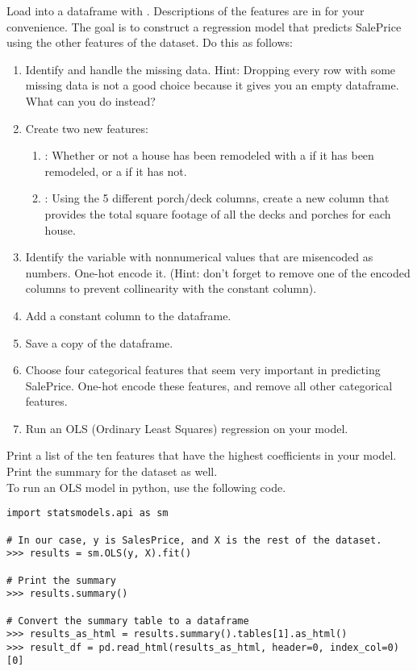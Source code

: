 \begin{problem}
\label{prob:boston-housing}
Load  into a dataframe with . Descriptions of the features are in  for your convenience.  
The goal is to construct a regression model that predicts SalePrice using the other features of the dataset.  Do this as follows:

\begin{enumerate}
	\item Identify and handle the missing data.  Hint: Dropping every row with some missing data is not a good choice because it gives you an empty dataframe.  What can you do instead?
	
	\item Create two new features:
		\begin{enumerate}
			\item {}: Whether or not a house has been remodeled with a  if it has been remodeled, or a  if it has not.
			\item {}: Using the 5 different porch/deck columns, create a new column that provides the total square footage of all the decks and porches for each house. 
		\end{enumerate}
    
	\item Identify the variable with nonnumerical values that are misencoded as numbers.  One-hot encode it. (Hint: don't forget to remove one of the encoded columns to prevent collinearity with the constant column).
    
    \item Add a constant column to the dataframe.

    \item Save a copy of the dataframe.

	\item Choose four categorical features that seem very important in predicting SalePrice. One-hot encode these features, and remove all other categorical features.
		
	\item Run an OLS (Ordinary Least Squares) regression on your model.  
\end{enumerate}
	
Print a list of the ten features that have the highest coefficients in your model.
Print the summary for the dataset as well. 
\\

\noindent To run an OLS model in python, use the following code.
\begin{lstlisting}
import statsmodels.api as sm

# In our case, y is SalesPrice, and X is the rest of the dataset. 
>>> results = sm.OLS(y, X).fit()

# Print the summary
>>> results.summary()

# Convert the summary table to a dataframe
>>> results_as_html = results.summary().tables[1].as_html()
>>> result_df = pd.read_html(results_as_html, header=0, index_col=0)[0]
\end{lstlisting}
\label{prob:housing}
\end{problem}

